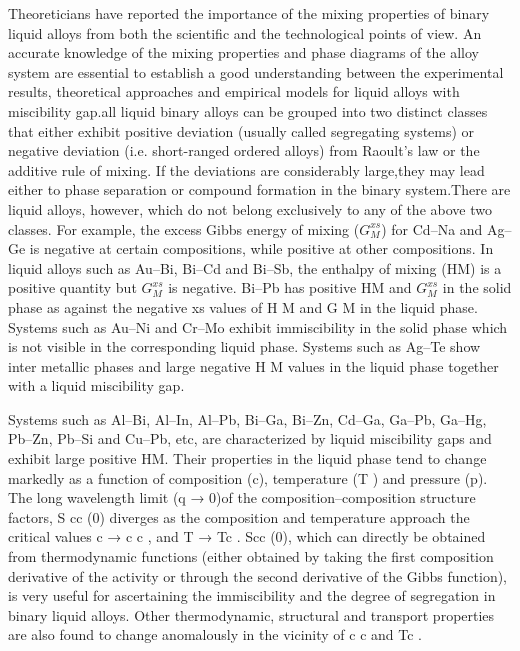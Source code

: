 \documentclass[12pt, letterpaper]{article}
\begin{document}
    Theoreticians have reported the importance of the mixing properties of binary liquid alloys from both the scientific and the technological points of view. 
    An accurate knowledge of the mixing properties and phase diagrams of the alloy system are essential to establish a good understanding between the experimental 
    results, theoretical approaches and empirical models for liquid alloys with miscibility gap.all liquid binary alloys can be grouped into two distinct classes that 
    either exhibit positive deviation
    (usually called segregating systems) or negative deviation (i.e. short-ranged ordered alloys) from Raoult’s law or the additive rule of mixing. If the deviations 
    are considerably large,they may lead either to phase separation or compound formation in the binary system.There are liquid alloys, however, which do not belong 
    exclusively to any of the above two classes. For example, the excess Gibbs energy of mixing ($G ^{xs} _{M} $) for Cd–Na and Ag–Ge is negative at certain compositions, 
    while positive at other compositions. In liquid alloys such as Au–Bi, Bi–Cd and Bi–Sb, the enthalpy of mixing (HM) is a positive quantity but $G^{xs}_{M}$ is negative. 
    Bi–Pb has positive HM and $G^{xs} _{M}$ in the solid phase as against the negative xs values of H M and G M in the liquid phase. Systems such as Au–Ni and Cr–Mo exhibit 
    immiscibility in the solid phase which is not visible in the corresponding liquid phase. Systems such as Ag–Te show inter metallic phases and large negative H M 
    values in the liquid phase together with a liquid miscibility gap.

    Systems such as Al–Bi, Al–In, Al–Pb, Bi–Ga, Bi–Zn, Cd–Ga, Ga–Pb, Ga–Hg, Pb–Zn, Pb–Si and Cu–Pb, etc, are characterized by liquid miscibility gaps and exhibit large 
    positive HM. Their properties in the liquid phase tend to change markedly as a function of composition (c), temperature (T ) and pressure (p). The long wavelength 
    limit (q → 0)of the composition–composition structure factors, S cc (0) diverges as the composition and temperature approach the critical values c → c c , and T → Tc .
    Scc (0), which can directly be obtained from thermodynamic functions (either obtained by taking the first composition derivative of the activity or through the 
    second derivative of the Gibbs function), is very useful for ascertaining the immiscibility and the degree of segregation in binary liquid alloys. Other 
    thermodynamic, structural and transport properties are also found to change anomalously in the vicinity of c c and Tc .
\end{document}
